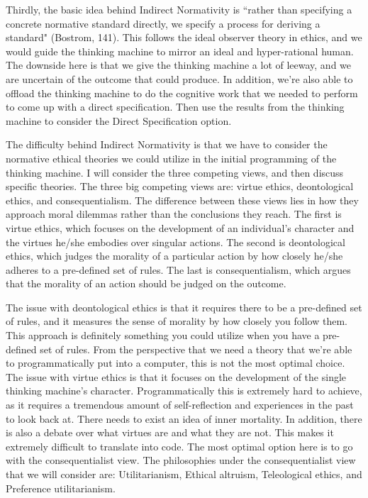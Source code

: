 \documentclass[11pt, oneside]{article}
\begin{document}
\par 
Thirdly, the basic idea behind Indirect Normativity is ``rather than specifying a concrete normative standard directly, we specify a process for deriving a standard" (Bostrom, 141). This follows the ideal observer theory in ethics, and we would guide the thinking machine to mirror an ideal and hyper-rational human. 
The downside here is that we give the thinking machine a lot of leeway, and we are uncertain of the outcome that could produce. 
In addition, we're also able to offload the thinking machine to do the cognitive work that we needed to perform to come up with a direct specification. Then use the results from the thinking machine to consider the Direct Specification option.
\par 
The difficulty behind Indirect Normativity is that we have to consider the normative ethical theories we could utilize in the initial programming of the thinking machine. I will consider the three competing views, and then discuss specific theories. The three big competing views are: virtue ethics, deontological ethics, and consequentialism. The difference between these views lies in how they approach moral dilemmas rather than the conclusions they reach. 
The first is virtue ethics, which focuses on the development of an individual's character and the virtues he/she embodies over singular actions. The second is deontological ethics, which judges the morality of a particular action by how closely he/she adheres to a pre-defined set of rules. The last is consequentialism, which argues that the morality of an action should be judged on the outcome. 
\par 
The issue with deontological ethics is that it requires there to be a pre-defined set of rules, and it measures the sense of morality by how closely you follow them. This approach is definitely something you could utilize when you have a pre-defined set of rules. From the perspective that we need a theory that we're able to programmatically put into a computer, this is not the most optimal choice.
The issue with virtue ethics is that it focuses on the development of the single thinking machine's character. Programmatically this is extremely hard to achieve, as it requires a tremendous amount of self-reflection and experiences in the past to look back at. There needs to exist an idea of inner mortality. In addition, there is also a debate over what virtues are and what they are not. This makes it extremely difficult to translate into code.
The most optimal option here is to go with the consequentialist view. The philosophies under the consequentialist view that we will consider are: Utilitarianism, Ethical altruism, Teleological ethics, and Preference utilitarianism.
\par 
\end{document}
